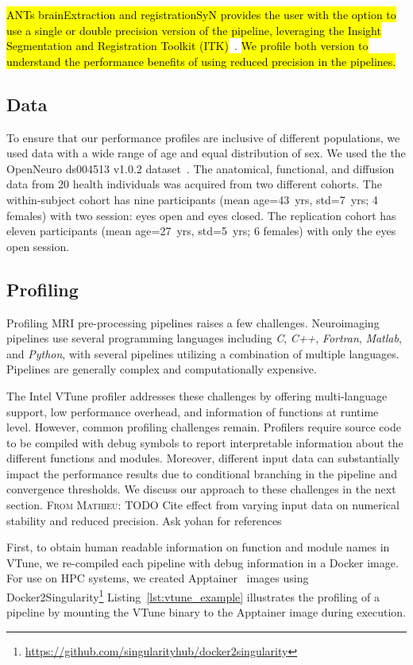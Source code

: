 \documentclass[conference]{IEEEtran}
\renewcommand{\lstlistingname}{Listing}
\newcommand{\MD}[1]{\color{magenta}\textsc{From Mathieu: }#1\color{black}}
\newcommand{\HL}[1]{\hl{#1}}
\begin{document}
\HL{ANTs brainExtraction and registrationSyN provides the user with the option to use a single or double precision version of the pipeline, leveraging the Insight Segmentation and Registration Toolkit (ITK)}~\cite{Yoo2002-ve}. \HL{We profile both version to understand the performance benefits of using reduced precision in the pipelines.}

\subsection{Data}
To ensure that our performance profiles are inclusive of different populations, we used data with a wide range of age and equal distribution of sex. We used the the OpenNeuro ds004513 v1.0.2 dataset~\cite{ds004513:1.0.2}. The anatomical, functional, and diffusion data from 20 health individuals was acquired from two different cohorts. The within-subject cohort has nine participants (mean age=43~yrs, std=7~yrs; 4 females) with two session: eyes open and eyes closed. The replication cohort has eleven participants (mean age=27~yrs, std=5~yrs; 6 females) with only the eyes open session.

\subsection{Profiling}
Profiling MRI pre-processing pipelines raises a few challenges. Neuroimaging pipelines use several programming languages including \textit{C}, \textit{C++}, \textit{Fortran}, \textit{Matlab}, and \textit{Python}, with several pipelines utilizing a combination of multiple languages. Pipelines are generally complex and computationally expensive.

The Intel VTune profiler addresses these challenges by offering multi-language support, low performance overhead, and information of functions at runtime level. However, common profiling challenges remain. Profilers require source code to be compiled with debug symbols to report interpretable information about the different functions and modules. Moreover, different input data can substantially impact the performance results due to conditional branching in the pipeline and convergence thresholds. We discuss our approach to these challenges in the next section.
\MD{TODO Cite effect from varying input data on numerical stability and reduced precision. Ask yohan for references}
		
First, to obtain human readable information on function and module names in VTune, we re-compiled each pipeline with debug information in a Docker image. For use on HPC systems, we created Apptainer~\cite{Kurtzer2017-bu} images using Docker2Singularity\footnote{\href{https://github.com/singularityhub/docker2singularity}{https://github.com/singularityhub/docker2singularity}} \lstlistingname~\ref{lst:vtune_example} illustrates the profiling of a pipeline by mounting the VTune binary to the Apptainer image during execution.
\end{document}
